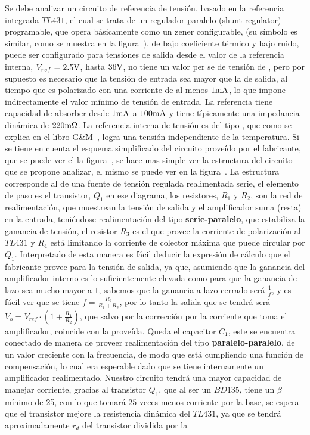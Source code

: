 Se debe analizar un circuito de referencia de tensión, basado en la referencia integrada $TL431$, el cual se trata de un regulador paralelo (shunt regulator) programable, que opera básicamente como un zener configurable, (su símbolo es similar, como se muestra en la figura~), de bajo coeficiente térmico y bajo ruido, puede ser configurado para tensiones de salida desde el valor de la referencia interna, $V_{ref} = 2.5 \si[per-mode=symbol]{\volt}$, hasta $36 \si[per-mode=symbol]{\volt}$, no tiene un valor per se de tensión de , pero por supuesto es necesario que la tensión de entrada sea mayor que la de salida, al tiempo que es polarizado con una corriente de al menos $1 \si[per-mode=symbol]{\milli\ampere}$, lo que impone indirectamente el valor mínimo de tensión de entrada.
La referencia tiene capacidad de absorber desde $1 \si[per-mode=symbol]{\milli\ampere}$ a $100 \si[per-mode=symbol]{\milli\ampere}$ y tiene típicamente una impedancia dinámica de $220 \si[per-mode=symbol]{\milli\ohm}$. La referencia interna de tensión es del tipo , que como se explica en el libro G\&M~\cite{Gray_Meyer5}, logra una tensión independiente de la temperatura. Si se tiene en cuenta el esquema simplificado del circuito proveído por el fabricante, que se puede ver el la figura~, se hace mas simple ver la estructura del circuito que se propone analizar, el mismo se puede ver en la figura~. La estructura corresponde al de una fuente de tensión regulada realimentada serie, el elemento de paso es el transistor, $Q_{1}$ en ese diagrama, los resistores, $R_{1}$ y $R_{2}$, son la red de realimentación, que muestrean la tensión de salida y el amplificador suma (resta) en la entrada, teniéndose realimentación del tipo \textbf{serie-paralelo}, que estabiliza la ganancia de tensión, el resistor $R_{3}$ es el que provee la corriente de polarización al $TL431$ y $R_{4}$ está limitando la corriente de colector máxima que puede circular por $Q_{1}$. Interpretado de esta manera es fácil deducir la expresión de cálculo que el fabricante provee para la tensión de salida, ya que, asumiendo que la ganancia del amplificador interno es lo suficientemente elevada como para que la ganancia de lazo sea mucho mayor a $1$, sabemos que la ganancia a lazo cerrado será $\frac{1}{f}$, y es fácil ver que se tiene $f = \frac{R_{2}}{R_{1} + R_{2}}$, por lo tanto la salida que se tendrá será $V_{o} = V_{ref} \cdot \left(1 +  \frac{R_{1}}{R_{2}} \right)$, que salvo por la corrección por la corriente que toma el amplificador, coincide con la proveída. Queda el capacitor $C_{1}$, este se encuentra conectado de manera de proveer realimentación del tipo \textbf{paralelo-paralelo}, de un valor creciente con la frecuencia, de modo que está cumpliendo una función de compensación, lo cual era esperable dado que se tiene internamente un amplificador realimentado. Nuestro circuito tendrá una mayor capacidad de manejar corriente, gracias al transistor $Q_{1}$, que al ser un $BD135$, tiene un $\beta$ mínimo de 25, con lo que tomará $25$ veces menos corriente por la base, se espera que el transistor mejore la resistencia dinámica del $TL431$, ya que se tendrá aproximadamente $r_{d}$ del transistor dividida por la 
